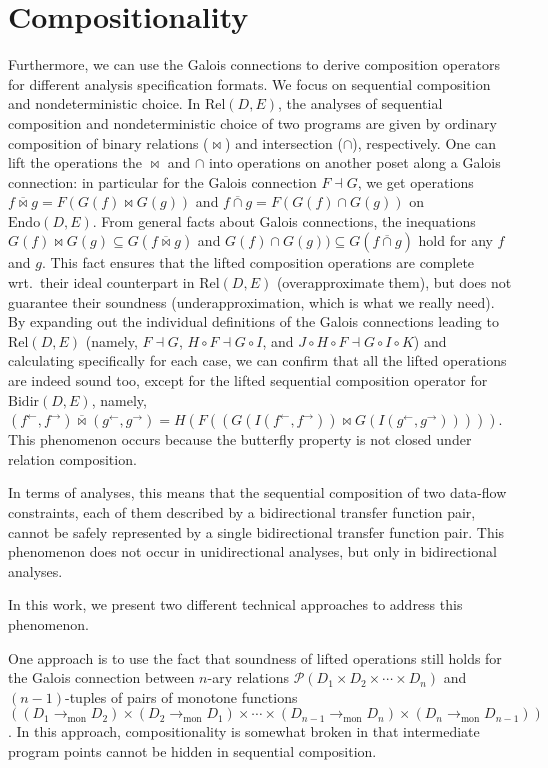 \documentclass{easychair}
\theoremstyle{definition}
\newcommand{\Pow}{\mathcal{P}}
\newcommand{\Rel}{\mathrm{Rel}}
\newcommand{\Endo}{\mathrm{Endo}}
\newcommand{\Bidir}{\mathrm{Bidir}}
\newcommand{\tomon}{\to_{\mathrm{mon}}}
\newcommand{\ff}{{f^{\rightarrow}}}
\newcommand{\fb}{{f^{\leftarrow}}}
\newcommand{\gf}{{g^{\rightarrow}}}
\newcommand{\gb}{{g^{\leftarrow}}}
\newcommand{\comp}{\circ}
\newcommand{\bowtielift}{\mathbin{\overline{\bowtie}}}
\newcommand{\caplift}{\mathbin{\overline{\cap}}}
\begin{document}
\section{Compositionality}

Furthermore, we can use the Galois connections to derive composition operators for different analysis specification formats. We focus on sequential composition and nondeterministic choice. In $\Rel(D, E)$,
the analyses of sequential composition and nondeterministic choice of two programs are given by ordinary composition of binary relations ($\bowtie$) and intersection ($\cap$), respectively. One can lift the operations the $\bowtie$ and $\cap$
into operations on another poset along a Galois connection: in particular for the Galois connection $F \dashv G$, we get operations $f \bowtielift g = F (G(f) \bowtie G(g))$ and $f \caplift g = F(G (f) \cap G(g))$ on $\Endo(D,E)$.
From general facts about Galois connections, the inequations
$G(f) \bowtie G(g) \subseteq G (f \bowtielift g)$ and $G(f) \cap G(g)) \subseteq G(f \caplift g)$ hold for any $f$ and $g$.
This fact ensures that the lifted composition operations are complete wrt.\ their ideal counterpart in $\Rel(D, E)$ (overapproximate them), but does not guarantee their soundness (underapproximation, which is what we really need).
By expanding out the individual definitions of the Galois connections leading to $\Rel(D ,E)$ (namely, $F \dashv G$, $H \comp F \dashv G \comp I$, and $J \comp H \comp F \dashv G \comp I \comp K$) and calculating specifically for each case, we can confirm that all the lifted operations are indeed sound too, except for the lifted sequential composition operator for $\Bidir(D, E)$, namely, $(\fb , \ff) \bowtielift (\gb , \gf) = H(F((G(I(\fb , \ff)) \bowtie G(I(\gb , \gf)))))$. This phenomenon occurs because the butterfly property is not closed under relation composition.

In terms of analyses, this means that the sequential composition of two data-flow constraints, each of them described by a bidirectional transfer function pair, cannot be safely represented by a single bidirectional transfer function pair. This phenomenon does not occur in unidirectional analyses, but only in bidirectional analyses.

In this work, we present two different technical approaches to address this phenomenon.

One approach is to use the fact that soundness of lifted operations still holds for the Galois connection between $n$-ary relations $\Pow(D_{1} \times D_{2} \times  \cdots  \times D_{n})$ and $(n-1)$-tuples of pairs of monotone functions $((D_{1} \tomon D_{2}) \times (D_{2} \tomon D_{1}) \times \cdots \times (D_{n-1} \tomon D_{n}) \times (D_{n} \tomon D_{n-1}))$. In this approach, compositionality is somewhat broken in that intermediate program points cannot be hidden in sequential composition. 
\end{document}
